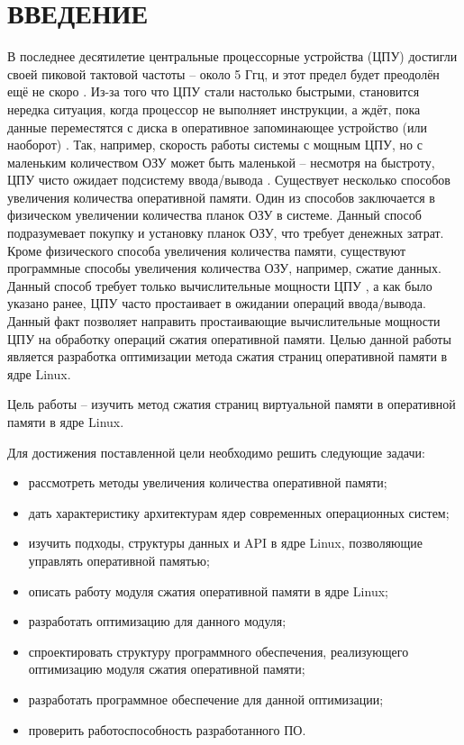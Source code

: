 \section*{ВВЕДЕНИЕ}

В последнее десятилетие центральные процессорные устройства (ЦПУ) достигли своей пиковой тактовой частоты -- около 5 Ггц, и этот предел будет преодолён ещё не скоро \cite{cpu_pick}. Из-за того что ЦПУ стали настолько быстрыми, становится нередка ситуация, когда процессор не выполняет инструкции, а ждёт, пока данные переместятся с диска в оперативное запоминающее устройство (или наоборот) \cite{in-kernel-memory-compression}. Так, например, скорость работы системы с мощным ЦПУ, но с маленьким количеством ОЗУ может быть маленькой -- несмотря на быстроту, ЦПУ чисто ожидает подсистему ввода/вывода \cite{in-kernel-memory-compression}. Существует несколько способов увеличения количества оперативной памяти. Один из способов заключается в физическом увеличении количества планок ОЗУ в системе. Данный способ подразумевает покупку и установку планок ОЗУ, что требует денежных затрат. Кроме физического способа увеличения количества памяти, существуют программные способы увеличения количества ОЗУ, например, сжатие данных. Данный способ требует только вычислительные мощности ЦПУ \cite{data-compression-encyclopedia}, а как было указано ранее, ЦПУ часто простаивает в ожидании операций ввода/вывода. Данный факт позволяет направить простаивающие вычислительные мощности ЦПУ на обработку операций сжатия оперативной памяти. Целью данной работы является разработка оптимизации метода сжатия страниц оперативной памяти в ядре Linux.

Цель работы -- изучить метод сжатия страниц виртуальной памяти в оперативной памяти в ядре Linux.

Для достижения поставленной цели необходимо решить следующие задачи:

\begin{itemize}
	\item рассмотреть методы увеличения количества оперативной памяти;
	\item дать характеристику архитектурам ядер современных операционных систем;
	\item изучить подходы, структуры данных и API \cite{api} в ядре Linux, позволяющие управлять оперативной памятью;
	\item описать работу модуля сжатия оперативной памяти в ядре Linux;
	\item разработать оптимизацию для данного модуля;
	\item спроектировать структуру программного обеспечения, реализующего оптимизацию модуля сжатия оперативной памяти;
	\item разработать программное обеспечение для данной оптимизации;
	\item проверить работоспособность разработанного ПО.
\end{itemize}

\pagebreak
